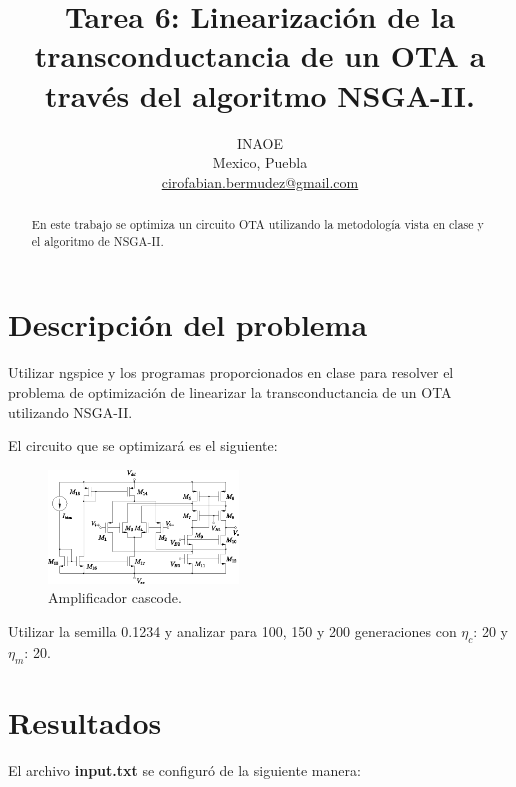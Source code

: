 \documentclass[conference]{IEEEtran}
\begin{document}
\title{Tarea 6: Linearización de la transconductancia de un OTA a través del algoritmo NSGA-II.
}

\author{
INAOE\\
Mexico, Puebla \\
\url{cirofabian.bermudez@gmail.com}
}

\maketitle

\begin{abstract}
En este trabajo se optimiza un circuito OTA utilizando la metodología vista en clase y el algoritmo de NSGA-II.
\end{abstract}



\section{Descripción del problema}

Utilizar ngspice y los programas proporcionados en clase para resolver el problema de optimización de linearizar la transconductancia de un OTA utilizando NSGA-II.

El circuito que se optimizará es el siguiente:

\begin{figure}[hbtp]
\centering
\includegraphics[width=0.45\textwidth]{circuito.eps}
\caption{Amplificador cascode.}
\end{figure}

Utilizar la semilla 0.1234 y analizar para 100, 150 y 200 generaciones con $\eta_{c}$: 20 y  $\eta_{m}$: 20.

\section{Resultados}

El archivo \textbf{input.txt} se configuró de la siguiente manera:
\end{document}
